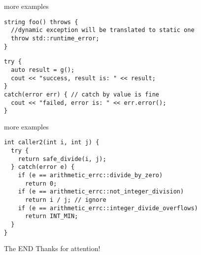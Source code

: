 \documentclass[10pt,a4paper]{beamer}
\begin{document}
\begin{frame}[fragile]{more examples}

	\begin{verbatim}
string foo() throws {
  //dynamic exception will be translated to static one
  throw std::runtime_error; 
}
	\end{verbatim}
	
	\hfill
	
	\begin{verbatim}
try {
  auto result = g();
  cout << "success, result is: " << result;
}
catch(error err) { // catch by value is fine
  cout << "failed, error is: " << err.error();
}
	\end{verbatim}
	
	
\end{frame}

\begin{frame}[fragile]{more examples}
	\begin{verbatim}
int caller2(int i, int j) {
  try {
    return safe_divide(i, j);
  } catch(error e) {
    if (e == arithmetic_errc::divide_by_zero)
      return 0;
    if (e == arithmetic_errc::not_integer_division)
      return i / j; // ignore
    if (e == arithmetic_errc::integer_divide_overflows)
      return INT_MIN;
  }
}
	\end{verbatim}
	
\end{frame}



\begin{frame}{The END}
\centering
	Thanks for attention!
\end{frame}
	
\end{document}
